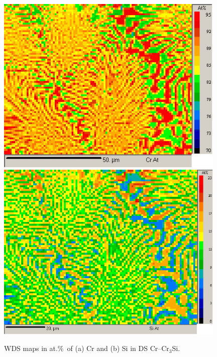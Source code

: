 %
\begin{landscape}
\begin{figure}
\begin{center}
\includegraphics[width=11cm]{creutCrmap}
\includegraphics[width=11cm]{creutSimap}
\caption{WDS maps in at.\%\ of (a) Cr and (b) Si in DS Cr--Cr$_3$Si.}
\label{fig:creutmap}
\end{center}
\end{figure}
\end{landscape}
%

